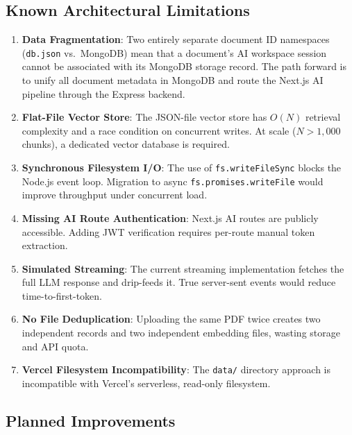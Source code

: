\documentclass[conference]{IEEEtran}
\begin{document}
\subsection{Known Architectural Limitations}

\begin{enumerate}[leftmargin=*]
  \item \textbf{Data Fragmentation}: Two entirely separate document ID namespaces (\texttt{db.json} vs.\ MongoDB) mean that a document's AI workspace session cannot be associated with its MongoDB storage record. The path forward is to unify all document metadata in MongoDB and route the Next.js AI pipeline through the Express backend.

  \item \textbf{Flat-File Vector Store}: The JSON-file vector store has $O(N)$ retrieval complexity and a race condition on concurrent writes. At scale ($N > 1{,}000$ chunks), a dedicated vector database is required.

  \item \textbf{Synchronous Filesystem I/O}: The use of \texttt{fs.writeFileSync} blocks the Node.js event loop. Migration to async \texttt{fs.promises.writeFile} would improve throughput under concurrent load.

  \item \textbf{Missing AI Route Authentication}: Next.js AI routes are publicly accessible. Adding JWT verification requires per-route manual token extraction.

  \item \textbf{Simulated Streaming}: The current streaming implementation fetches the full LLM response and drip-feeds it. True server-sent events would reduce time-to-first-token.

  \item \textbf{No File Deduplication}: Uploading the same PDF twice creates two independent records and two independent embedding files, wasting storage and API quota.

  \item \textbf{Vercel Filesystem Incompatibility}: The \texttt{data/} directory approach is incompatible with Vercel's serverless, read-only filesystem.
\end{enumerate}

\subsection{Planned Improvements}
\end{document}
